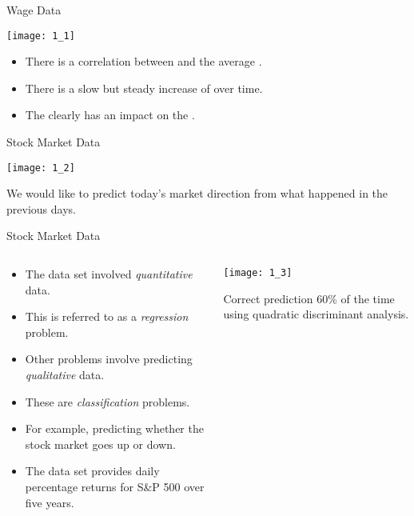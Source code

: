 \documentclass[mathserif, aspectratio=169]{beamer}
\begin{document}
\begin{frame}{Wage Data}
	\vspace{-1cm}
	\begin{center}
		\texttt{[image: 1\_1]}
	\end{center}
	\vspace{-5mm}
	\begin{itemize}
		\item There is a correlation between  and the average .
		\item There is a slow but steady increase of  over time.
		\item The  clearly has an impact on the .
	\end{itemize}
\end{frame}

\begin{frame}{Stock Market Data}
	\begin{center}
		\texttt{[image: 1\_2]}

		{\footnotesize We would like to predict today's market direction from what happened
		in the previous days.}
	\end{center}
\end{frame}

\begin{frame}{Stock Market Data}
	\begin{columns}
		\begin{column}{0.6\textwidth}
			\begin{itemize}
				\item The  data set involved \emph{quantitative} data.
				\item This is referred to as a \emph{regression} problem.
				\item Other problems involve predicting \emph{qualitative} data.
				\item These are \emph{classification} problems.
				\item For example, predicting whether the stock market goes up or down.
				\item The  data set provides daily percentage returns for
					S\&P 500 over five years.
			\end{itemize}
		\end{column}
		\begin{column}{0.4\textwidth}
			\vspace{-1.2cm}
			\begin{center}
				\texttt{[image: 1\_3]}

				\begin{minipage}[b]{0.7\textwidth}
					{\footnotesize Correct prediction 60\% of the time using quadratic discriminant analysis.}
				\end{minipage}
			\end{center}
		\end{column}
	\end{columns}
\end{frame}
\end{document}
